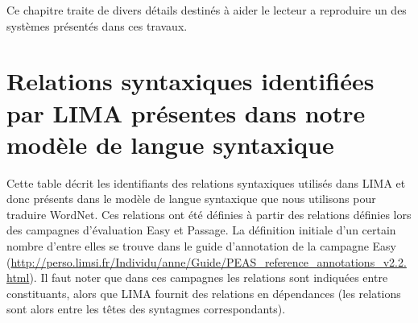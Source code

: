 \documentclass[oneside,parskip,draft]{scrbook}
\begin{document}
Ce chapitre traite de divers détails destinés à aider le lecteur a reproduire
un des systèmes présentés dans ces travaux.

\section{Relations syntaxiques identifiées par LIMA présentes dans notre modèle
de langue syntaxique}
\label{relations_modele_langue}

Cette table décrit les identifiants des relations syntaxiques utilisés dans
LIMA et donc présents dans le modèle de langue syntaxique que nous utilisons
pour traduire WordNet. Ces relations ont été définies à partir des relations
définies lors des campagnes d'évaluation Easy et Passage. La définition
initiale d'un certain nombre d'entre elles se trouve dans le guide d'annotation
de la campagne Easy
(\url{http://perso.limsi.fr/Individu/anne/Guide/PEAS_reference_annotations_v2.2.html}).
Il faut noter que dans ces campagnes les relations sont indiquées entre
constituants, alors que LIMA fournit des relations en dépendances (les
relations sont alors entre les têtes des syntagmes correspondants).
\end{document}
